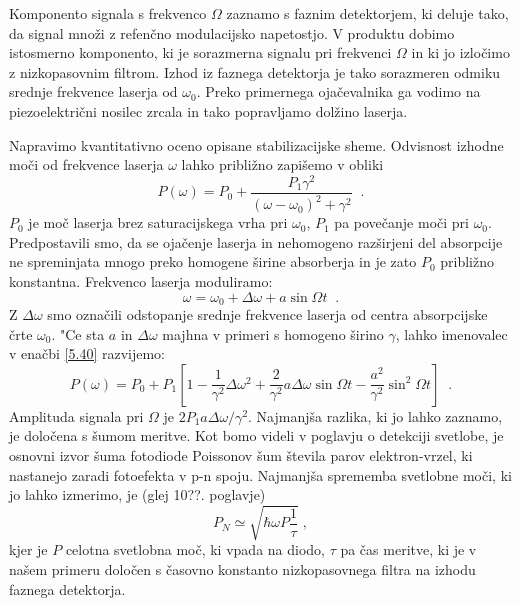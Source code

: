 Komponento signala s frekvenco $\Omega$ zaznamo s faznim detektorjem, ki
deluje tako, da signal množi z refenčno modulacijsko napetostjo. V
produktu dobimo istosmerno komponento, ki je sorazmerna signalu pri
frekvenci $\Omega$ in ki jo izločimo z nizkopasovnim filtrom. Izhod iz
faznega detektorja je tako sorazmeren odmiku srednje frekvence laserja od $%
\omega_0$. Preko primernega ojačevalnika ga vodimo na piezoelektrični
nosilec zrcala in tako popravljamo dolžino laserja.

Napravimo kvantitativno oceno opisane stabilizacijske sheme. Odvisnost
izhodne moči od frekvence laserja $\omega$ lahko približno zapišemo v
obliki 
\begin{equation}  \label{5.40}
P(\omega)=P_0 + \frac{P_1\gamma^2}{(\omega- \omega_0)^2+\gamma^2}\;\;.
\end{equation}
$P_0$ je moč laserja brez saturacijskega vrha pri $\omega_0$, $P_1$ pa
povečanje moči pri $\omega_0$. Predpostavili smo, da se ojačenje laserja
in nehomogeno razširjeni del absorpcije ne spreminjata mnogo preko homogene
širine absorberja in je zato $P_0$ približno konstantna. Frekvenco laserja
moduliramo: 
\begin{equation}  \label{5.41}
\omega=\omega_0+\Delta\omega+a \sin \Omega t\;\;.
\end{equation}
Z $\Delta\omega$ smo označili odstopanje srednje frekvence laserja od
centra absorpcijske črte $\omega_0$. "Ce sta $a$ in $\Delta\omega$ majhna v
primeri s homogeno širino $\gamma$, lahko imenovalec v enačbi \ref{5.40}
razvijemo: 
\begin{equation}  \label{5.42}
P(\omega)=P_0+P_1 [1-\frac{1}{\gamma^2}\Delta\omega^2 +\frac{2}{\gamma^2} a
\Delta\omega \sin\Omega t - \frac{a^2}{\gamma^2}\sin^2\Omega t ]\;\;.
\end{equation}
Amplituda signala pri $\Omega$ je $2P_1 a \Delta\omega/\gamma^2$. Najmanjša
razlika, ki jo lahko zaznamo, je določena s šumom meritve. Kot bomo videli
v poglavju o detekciji svetlobe, je osnovni izvor šuma fotodiode Poissonov
šum števila parov elektron-vrzel, ki nastanejo zaradi fotoefekta v p-n
spoju. Najmanjša sprememba svetlobne moči, ki jo lahko izmerimo, je (glej
10??. poglavje) 
\begin{equation}  \label{5.43}
P_N\simeq \sqrt{\hbar\omega P \frac{1}{\tau}}\;,
\end{equation}
kjer je $P$ celotna svetlobna moč, ki vpada na diodo, $\tau$ pa čas
meritve, ki je v našem primeru določen s časovno konstanto nizkopasovnega
filtra na izhodu faznega detektorja.

